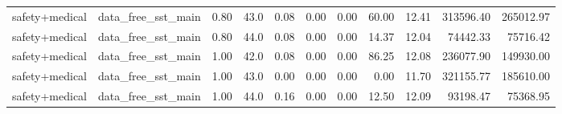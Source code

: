 \begin{table}[H]
{\begin{tabular}{llllrrrrrrr}
safety+medical & data\_free\_sst\_main & 0.80 & 43.0 & 0.08 & 0.00 & 0.00 & 60.00 & 12.41 & 313596.40 & 265012.97 \\
safety+medical & data\_free\_sst\_main & 0.80 & 44.0 & 0.08 & 0.00 & 0.00 & 14.37 & 12.04 & 74442.33 & 75716.42 \\
safety+medical & data\_free\_sst\_main & 1.00 & 42.0 & 0.08 & 0.00 & 0.00 & 86.25 & 12.08 & 236077.90 & 149930.00 \\
safety+medical & data\_free\_sst\_main & 1.00 & 43.0 & 0.00 & 0.00 & 0.00 & 0.00 & 11.70 & 321155.77 & 185610.00 \\
safety+medical & data\_free\_sst\_main & 1.00 & 44.0 & 0.16 & 0.00 & 0.00 & 12.50 & 12.09 & 93198.47 & 75368.95 \\
\bottomrule
\end{tabular}
}
\end{table}
